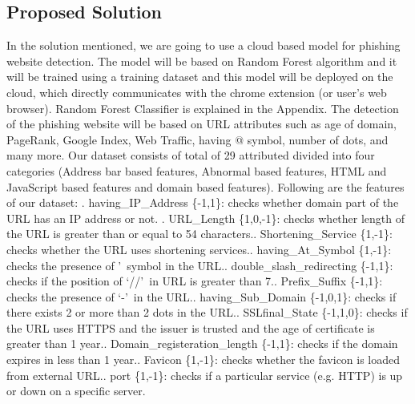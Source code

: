 \documentclass[12pt]{article}
\begin{document}
\subsection{Proposed Solution}
In the solution mentioned, we are going to use a cloud based model for phishing website detection. The model will be based on Random Forest algorithm and it will be trained using a training dataset and this model will be deployed on the cloud, which directly communicates with the chrome extension (or user’s web browser). Random Forest Classifier is explained in the Appendix. The detection of the phishing website will be based on URL attributes such as age of domain, PageRank, Google Index, Web Traffic, having @ symbol, number of dots, and many more. Our dataset consists of total of 29 attributed divided into four categories (Address bar based features, Abnormal based features, HTML and JavaScript based features and domain based features).\newline
Following are the features of our dataset: . having\_IP\_Address \{-1,1\}: checks whether domain part of the URL has an IP address or not. . URL\_Length \{1,0,-1\}: checks whether length of the URL is greater than or equal to 54 characters.. Shortening\_Service \{1,-1\}: checks whether the URL uses shortening services.. having\_At\_Symbol \{1,-1\}: checks the presence of \lq@\rq\  symbol in the URL.. double\_slash\_redirecting \{-1,1\}: checks if the position of \lq//\rq\ in URL is greater than 7.. Prefix\_Suffix \{-1,1\}: checks the presence of \lq-\rq\ in the URL.. having\_Sub\_Domain \{-1,0,1\}: checks if there exists 2 or more than 2 dots in the URL.. SSLfinal\_State \{-1,1,0\}: checks if the URL uses HTTPS and the issuer is trusted and the age of certificate is greater than 1 year.. Domain\_registeration\_length \{-1,1\}: checks if the domain expires in less than 1 year.. Favicon \{1,-1\}: checks whether the favicon is loaded from external URL.. port \{1,-1\}: checks if a particular service (e.g. HTTP) is up or down on a specific server.\newline
\end{document}
